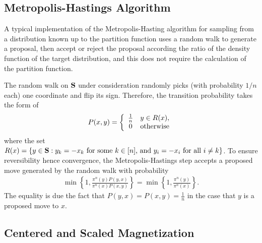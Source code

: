 \documentclass{amsart}
\newcommand{\bS}{{\bf S}}               %
\newtheorem{rem}[thm]{Remark}
\begin{document}
         
\subsection{Metropolis-Hastings Algorithm}
         
         
         A typical implementation of the Metropolis-Hasting algorithm for sampling from a distribution known up to the partition function uses a random walk to generate 
         a proposal, then accept or reject the proposal according the ratio of the density function of the target distribution, and this does not require the calculation of the partition function. 
         
         The random walk on $\bS$ under consideration randomly picks (with probability $1/n$ each) one coordinate and flip its sign. Therefore, the transition probability takes the form of
         \begin{align*}
         	P(x,y)=
         	\left\{ \begin{array}{cc}\frac{1}{n} & y\in R(x),
         		\\ 0& \hbox{otherwise} \end{array} \right.
         \end{align*}
         where the set $R(x) = \{ y\in \bS: \hbox{$y_k=-x_k$ for some $k\in [n]$, and $y_i=-x_i$ for all $i\neq k$}\}$. To ensure reversibility hence convergence, the Metropolis-Hastings
         step accepts a proposed move generated by the random walk with probability
         \begin{align*}
         	\min\left\{ 1, \frac{\pi^n(y)P(y,x)}{\pi^n(x)P(x,y)}\right\}=\min\left\{ 1, \frac{\pi^n(y)}{\pi^n(x)}\right\}.
         \end{align*}
         The equality is due the fact that $P(y,x)=P(x,y)=\frac{1}{n}$ in the case that $y$ is a proposed move to $x$. 
         \subsection{Centered and Scaled Magnetization}
         
\end{document}
